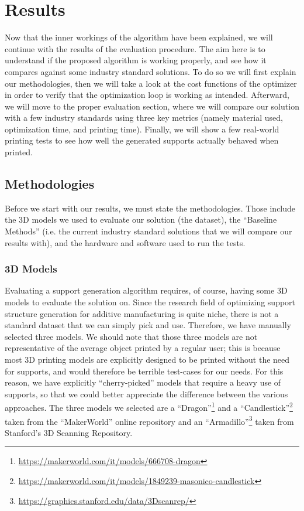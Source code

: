 \chapter{Results}
\label{cha:results}

Now that the inner workings of the algorithm have been explained, we will continue with the
results of the evaluation procedure. The aim here is to understand if the proposed algorithm
is working properly, and see how it compares against some industry standard solutions.
To do so we will first explain our methodologies, then we will take a look at the cost
functions of the optimizer in order to verify that the optimization loop is working as intended.
Afterward, we will move to the proper evaluation section, where we will compare our solution
with a few industry standards using three key metrics (namely material used, optimization time, and printing
time). Finally, we will show a few real-world printing tests to see how well the generated
supports actually behaved when printed.

\section{Methodologies}

Before we start with our results, we must state the methodologies. Those include the 3D models we used 
to evaluate our solution (the dataset), the ``Baseline Methods'' (i.e. the current industry standard
solutions that we will compare our results with), and the hardware and software used to run the tests.

\subsection{3D Models}

Evaluating a support generation algorithm requires, of course, having some 3D models to evaluate 
the solution on. Since the research field of optimizing support structure generation for additive manufacturing
is quite niche, there is not a standard dataset that we can simply pick and use. Therefore, we have manually
selected three models. We should note that those three models are not representative of the average object
printed by a regular user; this is because most 3D printing models are explicitly designed to be printed without
the need for supports, and would therefore be terrible test-cases for our needs. For this reason, we have
explicitly ``cherry-picked'' models that require a heavy use of supports, so that we could better
appreciate the difference between the various approaches.
The three models we selected are a ``Dragon''\footnote{\url{https://makerworld.com/it/models/666708-dragon}}
and a ``Candlestick''\footnote{\url{https://makerworld.com/it/models/1849239-masonico-candlestick}}
taken from the ``MakerWorld'' online repository
and an ``Armadillo''\footnote{\url{https://graphics.stanford.edu/data/3Dscanrep/}}
taken from Stanford's 3D Scanning Repository.

